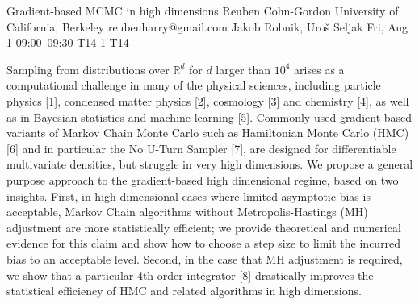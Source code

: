 \begin{talk}
  {Gradient-based MCMC in high dimensions}%
  {Reuben Cohn-Gordon}%
  {University of California, Berkeley}%
  {reubenharry@gmail.com}%
  {Jakob Robnik, Uroš Seljak}%
  {}%
  {Fri, Aug 1 09:00–09:30}%
  {T14-1}%
  {T14}%
  
				
			
Sampling from distributions over $\mathbb{R}^d$ for $d$ larger than $10^4$ arises as a computational challenge in many of the physical sciences, including particle physics [1], condensed matter physics [2], cosmology [3] and chemistry [4], as well as in Bayesian statistics and machine learning [5]. Commonly used gradient-based variants of Markov Chain Monte Carlo such as Hamiltonian Monte Carlo (HMC) [6] and in particular the No U-Turn Sampler [7], are designed for differentiable multivariate densities, but struggle in very high dimensions. 
We propose a general purpose approach to the gradient-based high dimensional regime, based on two insights. First, in high dimensional cases where limited asymptotic bias is acceptable, Markov Chain algorithms without Metropolis-Hastings (MH) adjustment are more statistically efficient; we provide theoretical and numerical evidence for this claim and show how to choose a step size to limit the incurred bias to an acceptable level. Second, in the case that MH adjustment is required, we show that a particular 4th order integrator [8] drastically improves the statistical efficiency of HMC and related algorithms in high dimensions.


\medskip


\end{talk}
